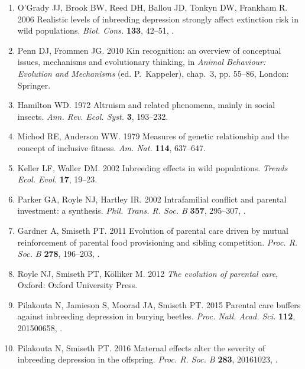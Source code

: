 \documentclass[12pt]{article}
\begin{document}
\begin{enumerate}
\item{O'Grady JJ, Brook BW, Reed DH, Ballou JD, Tonkyn DW,
  Frankham R. 2006 {Realistic levels of inbreeding depression strongly affect
  extinction risk in wild populations}. \textit{Biol. Cons.}
  \textbf{133}, 42--51, .}

\item{Penn DJ, Frommen JG. 2010 {Kin recognition: an overview of conceptual
  issues, mechanisms and evolutionary thinking}, in \textit{Animal Behaviour:
  Evolution and Mechanisms} (ed. P.~Kappeler), chap.~3, pp. 55--86, London:
  Springer.}

\item{Hamilton WD. 1972 {Altruism and related phenomena, mainly in social
  insects}. \textit{Ann. Rev. Ecol. Syst.} \textbf{3},
  193--232.}

\item{Michod RE, Anderson WW. 1979 {Measures of genetic relationship and
  the concept of inclusive fitness}. \textit{Am. Nat.} \textbf{114},
  637--647.}

\item{Keller LF, Waller DM. 2002 {Inbreeding effects in wild populations}.
  \textit{Trends Ecol. Evol.} \textbf{17}, 19--23.}

\item{Parker GA, Royle NJ, Hartley IR. 2002 {Intrafamilial conflict and
  parental investment: a synthesis.} \textit{Phil. Trans.
  R. Soc. B} \textbf{357}, 295--307, .}

\item{Gardner A, Smiseth PT. 2011 {Evolution of parental care driven by
  mutual reinforcement of parental food provisioning and sibling competition}.
  \textit{Proc. R. Soc. B}
  \textbf{278}, 196--203, .}

\item{Royle NJ, Smiseth PT, K{\"{o}}lliker M. 2012 \textit{{The evolution
  of parental care}}, Oxford: Oxford University Press.}

\item{Pilakouta N, Jamieson S, Moorad JA, Smiseth PT. 2015 {Parental
  care buffers against inbreeding depression in burying beetles}.
  \textit{Proc. Natl. Acad. Sci.} \textbf{112},
  201500658, .}

\item{Pilakouta N, Smiseth PT. 2016 {Maternal effects alter the severity of
  inbreeding depression in the offspring}. \textit{Proc. R.
  Soc. B} \textbf{283}, 20161023, .}


\end{enumerate}
\end{document}

